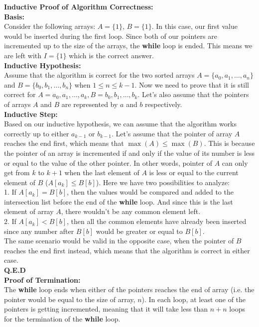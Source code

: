     \textbf{Inductive Proof of Algorithm Correctness:} \\
    \textbf{Basis:} \\
    Consider the following arrays: $A=\{1\}$, $B=\{1\}$. In this case, our first value would be inserted during the first loop. Since both of our pointers are incremented up to
    the size of the arrays, the \textbf{while} loop is ended. This means we are left with $I=\{1\}$ which is the correct answer. \\
    \textbf{Inductive Hypothesis:} \\
    Assume that the algorithm is correct for the two sorted arrays $A=\{a_0, a_1, \ldots, a_n\}$ and $B=\{b_0, b_1, \ldots, b_n\}$ when $1 \leq n \leq k-1$.
    Now we need to prove that it is still correct for $A={a_0, a_1, \ldots, a_k}, B={b_0, b_1, \ldots, b_k}$. Let's also assume that the pointers
    of arrays $A$ and $B$ are represented by $a$ and $b$ respectively. \\ 
    \textbf{Inductive Step:} \\
    Based on our inductive hypothesis, we can assume that the algorithm works correctly up to either $a_{k-1}$ or $b_{k-1}$. Let's assume that the pointer of 
    array $A$ reaches the end first, which means that $\max(A) \leq \max(B)$. This is because the pointer of an array is incremented if and only if the value of its number
    is less or equal to the value of the other pointer. In other words, pointer of $A$ can only get from $k$ to $k+1$ when the last element of $A$ is less or equal to
    the current element of $B$ ($A[a_k] \leq B[b]$). Here we have two possibilities to analyze: \\
    1. If $A[a_k] = B[b]$, then the values would be compared and added to the intersection list before the end of the \textbf{while} loop. And since this is the last element of
    array $A$, there wouldn't be any common element left. \\
    2. If $A[a_k] < B[b]$, then all the common elements have already been inserted since any number after $B[b]$ would be greater or equal to $B[b]$.\\
    The same scenario would be valid in the opposite case, when the pointer of $B$ reaches the end first instead, which means that the algorithm is correct in either case.\\
    \textbf{Q.E.D} \\

    \textbf{Proof of Termination:} \\
    The \textbf{while} loop ends when either of the pointers reaches the end of array (i.e. the pointer would be equal to the size of array, $n$). In each loop, at least one of the pointers is
    getting incremented, meaning that it will take less than $n+n$ loops for the termination of the \textbf{while} loop.
    \pagebreak
    \vspace{-7mm}
